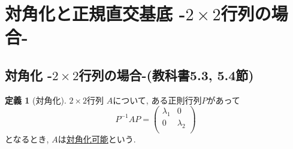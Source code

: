 \documentclass[dvipdfmx,a4paper,11pt]{article}
\theoremstyle{definition}
\newtheorem{dfn}[thm]{定義}
\begin{document}
\newpage

\section{対角化と正規直交基底 -$2 \times 2$行列の場合-}
\label{sec-4}
\subsection{対角化 -$2 \times 2$行列の場合-(教科書5.3, 5.4節)}

  \begin{tcolorbox}[
    colback = white,
    colframe = green!35!black,
    fonttitle = \bfseries,
    breakable = true]
    \begin{dfn}[対角化]
    
$2 \times 2$行列
$A$について, ある正則行列$P$があって
$$
P^{-1} A P=
\begin{pmatrix}
\lambda_1& 0 \\
0& \lambda_2\\
\end{pmatrix}
$$
となるとき, $A$は\underline{対角化可能}という.
  \end{dfn}
 \end{tcolorbox}
\end{document}
